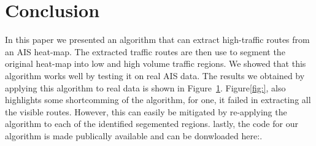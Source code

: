 \documentclass{article}
\begin{document}
\section{Conclusion}
In this paper we presented an algorithm that can extract high-traffic routes from an AIS heat-map. The extracted traffic routes are then use to segment the original 
heat-map into low and high volume traffic regions. We showed that this algorithm works well by testing it on real 
AIS data. The results we obtained by applying this algorithm to real data is shown in Figure~\ref{}. Figure\ref{fig:}, also highlights some shortcomming of the algorithm, for one, it failed in extracting all the visible routes. 
However, this can easily be mitigated by re-applying the algorithm to each of the identified segemented regions. lastly, the code for our algorithm is made publically available and can be donwloaded here:.

%  
%  
% 
% 
 
\end{document}
